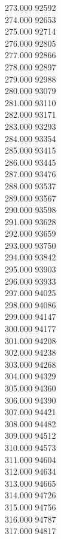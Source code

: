 { 273.000	92592 \\
 274.000	92653 \\
 275.000	92714 \\
 276.000	92805 \\
 277.000	92866 \\
 278.000	92897 \\
 279.000	92988 \\
 280.000	93079 \\
 281.000	93110 \\
 282.000	93171 \\
 283.000	93293 \\
 284.000	93354 \\
 285.000	93415 \\
 286.000	93445 \\
 287.000	93476 \\
 288.000	93537 \\
 289.000	93567 \\
 290.000	93598 \\
 291.000	93628 \\
 292.000	93659 \\
 293.000	93750 \\
 294.000	93842 \\
 295.000	93903 \\
 296.000	93933 \\
 297.000	94025 \\
 298.000	94086 \\
 299.000	94147 \\
 300.000	94177 \\
 301.000	94208 \\
 302.000	94238 \\
 303.000	94268 \\
 304.000	94329 \\
 305.000	94360 \\
 306.000	94390 \\
 307.000	94421 \\
 308.000	94482 \\
 309.000	94512 \\
 310.000	94573 \\
 311.000	94604 \\
 312.000	94634 \\
 313.000	94665 \\
 314.000	94726 \\
 315.000	94756 \\
 316.000	94787 \\
 317.000	94817 \\
}
